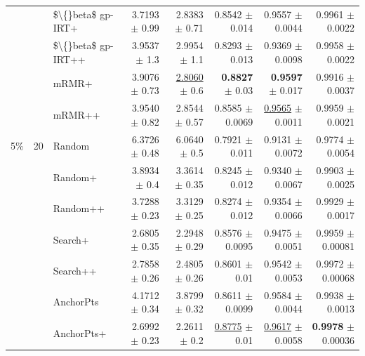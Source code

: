 \begin{longtable}{llp{}rrrrr}
 &  & \$\textbackslash\{\}beta\$ gp-IRT+ & 3.7193 {\scriptsize $\pm$ 0.99} & 2.8383 {\scriptsize $\pm$ 0.71} & 0.8542 {\scriptsize $\pm$ 0.014} & 0.9557 {\scriptsize $\pm$ 0.0044} & 0.9961 {\scriptsize $\pm$ 0.0022} \\
 &  & \$\textbackslash\{\}beta\$ gp-IRT++ & 3.9537 {\scriptsize $\pm$ 1.3} & 2.9954 {\scriptsize $\pm$ 1.1} & 0.8293 {\scriptsize $\pm$ 0.013} & 0.9369 {\scriptsize $\pm$ 0.0098} & 0.9958 {\scriptsize $\pm$ 0.0022} \\
 &  & mRMR+ & 3.9076 {\scriptsize $\pm$ 0.73} & \underline{2.8060} {\scriptsize $\pm$ 0.6} & \textbf{0.8827} {\scriptsize $\pm$ 0.03} & \textbf{0.9597} {\scriptsize $\pm$ 0.017} & 0.9916 {\scriptsize $\pm$ 0.0037} \\
 &  & mRMR++ & 3.9540 {\scriptsize $\pm$ 0.82} & 2.8544 {\scriptsize $\pm$ 0.57} & 0.8585 {\scriptsize $\pm$ 0.0069} & \underline{0.9565} {\scriptsize $\pm$ 0.0011} & 0.9959 {\scriptsize $\pm$ 0.0021} \\
\midrule
5\% & 20 & Random & 6.3726 {\scriptsize $\pm$ 0.48} & 6.0640 {\scriptsize $\pm$ 0.5} & 0.7921 {\scriptsize $\pm$ 0.011} & 0.9131 {\scriptsize $\pm$ 0.0072} & 0.9774 {\scriptsize $\pm$ 0.0054} \\
 &  & Random+ & 3.8934 {\scriptsize $\pm$ 0.4} & 3.3614 {\scriptsize $\pm$ 0.35} & 0.8245 {\scriptsize $\pm$ 0.012} & 0.9340 {\scriptsize $\pm$ 0.0067} & 0.9903 {\scriptsize $\pm$ 0.0025} \\
 &  & Random++ & 3.7288 {\scriptsize $\pm$ 0.23} & 3.3129 {\scriptsize $\pm$ 0.25} & 0.8274 {\scriptsize $\pm$ 0.012} & 0.9354 {\scriptsize $\pm$ 0.0066} & 0.9929 {\scriptsize $\pm$ 0.0017} \\
 &  & Search+ & 2.6805 {\scriptsize $\pm$ 0.35} & 2.2948 {\scriptsize $\pm$ 0.29} & 0.8576 {\scriptsize $\pm$ 0.0095} & 0.9475 {\scriptsize $\pm$ 0.0051} & 0.9959 {\scriptsize $\pm$ 0.00081} \\
 &  & Search++ & 2.7858 {\scriptsize $\pm$ 0.26} & 2.4805 {\scriptsize $\pm$ 0.26} & 0.8601 {\scriptsize $\pm$ 0.01} & 0.9542 {\scriptsize $\pm$ 0.0053} & 0.9972 {\scriptsize $\pm$ 0.00068} \\
 &  & AnchorPts & 4.1712 {\scriptsize $\pm$ 0.34} & 3.8799 {\scriptsize $\pm$ 0.32} & 0.8611 {\scriptsize $\pm$ 0.0099} & 0.9584 {\scriptsize $\pm$ 0.0044} & 0.9938 {\scriptsize $\pm$ 0.0013} \\
 &  & AnchorPts+ & 2.6992 {\scriptsize $\pm$ 0.23} & 2.2611 {\scriptsize $\pm$ 0.2} & \underline{0.8775} {\scriptsize $\pm$ 0.01} & \underline{0.9617} {\scriptsize $\pm$ 0.0058} & \textbf{0.9978} {\scriptsize $\pm$ 0.00036} \\

\end{longtable}
